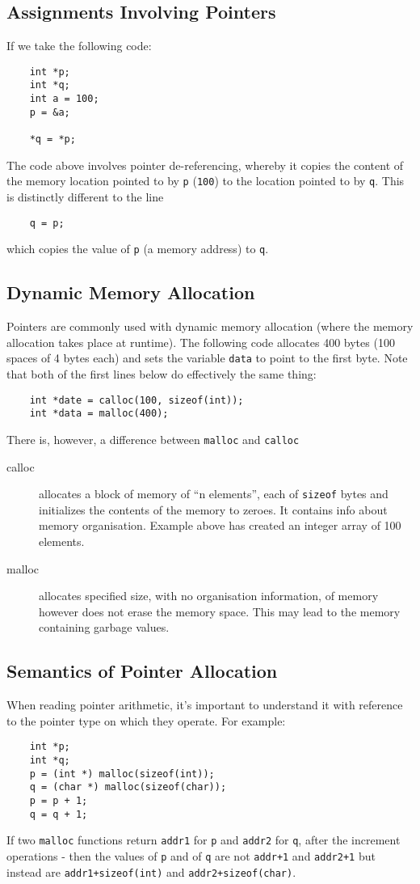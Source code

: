 \subsection{Assignments Involving Pointers}
If we take the following code:
\begin{verbatim}
    int *p;
    int *q;
    int a = 100;
    p = &a;

    *q = *p;
\end{verbatim}
The code above involves pointer de-referencing, whereby it copies the content of the memory location pointed to by \verb|p| (\verb|100|) to the location pointed to by \verb|q|. This is distinctly different to the line
\begin{verbatim}
    q = p;
\end{verbatim}
which copies the value of \verb|p| (a memory address) to \verb|q|.

\subsection{Dynamic Memory Allocation}
Pointers are commonly used with dynamic memory allocation (where the memory allocation takes place at runtime). The following code allocates 400 bytes (100 spaces of 4 bytes each) and sets the variable \verb|data| to point to the first byte. Note that both of the first lines below do effectively the same thing:
\begin{verbatim}
    int *date = calloc(100, sizeof(int));
    int *data = malloc(400);
\end{verbatim}
There is, however, a difference between \verb|malloc| and \verb|calloc|
\begin{description}
    \item[calloc] allocates a block of memory of ``n elements'', each of \verb|sizeof| bytes and initializes the contents of the memory to zeroes. It contains info about memory organisation. Example above has created an integer array of 100 elements.
    \item[malloc] allocates specified size, with no organisation information, of memory however does not erase the memory space. This may lead to the memory containing garbage values.
\end{description}

\subsection{Semantics of Pointer Allocation}
When reading pointer arithmetic, it's important to understand it with reference to the pointer type on which they operate. For example:
\begin{verbatim}
    int *p;
    int *q;
    p = (int *) malloc(sizeof(int));
    q = (char *) malloc(sizeof(char));
    p = p + 1;
    q = q + 1;
\end{verbatim}
If two \verb|malloc| functions return \verb|addr1| for \verb|p| and \verb|addr2| for \verb|q|, after the increment operations - then the values of \verb|p| and of \verb|q| are not \verb|addr+1| and \verb|addr2+1| but instead are \verb|addr1+sizeof(int)| and \verb|addr2+sizeof(char)|. 

